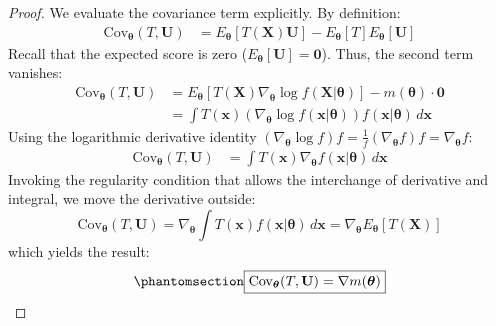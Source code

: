 \documentclass[
  letterpaper,
  DIV=11,
  numbers=noendperiod]{scrreprt}
\renewcommand{\[}{\begin{equation}}
\renewcommand{\]}{\end{equation}}
\theoremstyle{definition}
\theoremstyle{plain}
\theoremstyle{plain}
\theoremstyle{plain}
\theoremstyle{definition}
\theoremstyle{plain}
\theoremstyle{remark}
\begin{document}
\begin{proof}
We evaluate the covariance term explicitly. By definition: \[
\begin{aligned}
\text{Cov}_{\boldsymbol{\theta}}(T, \mathbf{U}) &= E_{\boldsymbol{\theta}}[T(\mathbf{X}) \mathbf{U}] - E_{\boldsymbol{\theta}}[T]E_{\boldsymbol{\theta}}[\mathbf{U}]
\end{aligned}
\] Recall that the expected score is zero
(\(E_{\boldsymbol{\theta}}[\mathbf{U}] = \mathbf{0}\)). Thus, the second
term vanishes: \[
\begin{aligned}
\text{Cov}_{\boldsymbol{\theta}}(T, \mathbf{U}) &= E_{\boldsymbol{\theta}}\left[ T(\mathbf{X}) \nabla_{\boldsymbol{\theta}} \log f(\mathbf{X}|\boldsymbol{\theta}) \right] - m(\boldsymbol{\theta}) \cdot \mathbf{0} \\
&= \int T(\mathbf{x}) \left( \nabla_{\boldsymbol{\theta}} \log f(\mathbf{x}|\boldsymbol{\theta}) \right) f(\mathbf{x}|\boldsymbol{\theta}) \, d\mathbf{x}
\end{aligned}
\] Using the logarithmic derivative identity
\((\nabla_{\boldsymbol{\theta}} \log f) f = \frac{1}{f} (\nabla_{\boldsymbol{\theta}} f) f = \nabla_{\boldsymbol{\theta}} f\):
\[
\begin{aligned}
\text{Cov}_{\boldsymbol{\theta}}(T, \mathbf{U}) &= \int T(\mathbf{x}) \nabla_{\boldsymbol{\theta}} f(\mathbf{x}|\boldsymbol{\theta}) \, d\mathbf{x}
\end{aligned}
\] Invoking the regularity condition that allows the interchange of
derivative and integral, we move the derivative outside: \[
\text{Cov}_{\boldsymbol{\theta}}(T, \mathbf{U}) = \nabla_{\boldsymbol{\theta}} \int T(\mathbf{x}) f(\mathbf{x}|\boldsymbol{\theta}) \, d\mathbf{x} = \nabla_{\boldsymbol{\theta}} E_{\boldsymbol{\theta}}[T(\mathbf{X})]
\] which yields the result:
\begin{equation}\phantomsection\label{eq-cov-T-Score}{
\boxed{\text{Cov}_{\boldsymbol{\theta}}(T, \mathbf{U}) = \nabla m(\boldsymbol{\theta})}
}\end{equation}
\end{proof}
\end{document}
